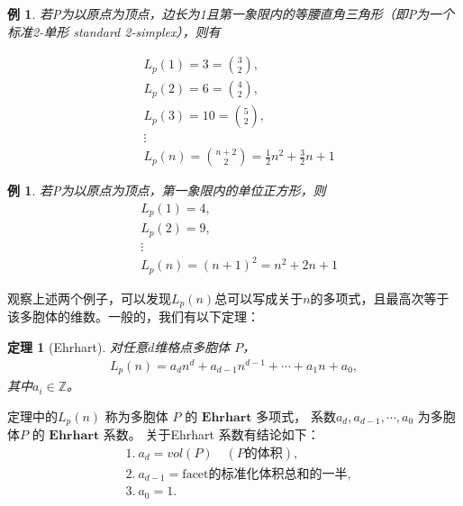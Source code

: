\documentclass[12pt,a4paper]{ctexbook} %
\newcounter{theorem}[section]
\newtheorem{theoreminner}[theorem]{定理}
\newtheorem{example}[theorem]{例}
\numberwithin{figure}{section}
\theoremstyle{problemstyle}
\numberwithin{equation}{section} %
\begin{document}
\begin{example}
若P为以原点为顶点，边长为1且第一象限内的等腰直角三角形（即P为一个标准2-单形 standard 2-simplex），则有

\begin{minipage}{0.5\textwidth}
    \begin{align*}
        &L_p(1)=3=\binom{3}{2}, \\
        &L_p(2)=6=\binom{4}{2}, \\
        &L_p(3)=10=\binom{5}{2},\\ 
        &\vdots \\
        &L_p(n)=\binom{n+2}{2}=\frac{1}{2}n^2+\frac{3}{2}n+1 
    \end{align*}
\end{minipage}
\begin{minipage}{0.5\textwidth}
\end{minipage}

\end{example}

\begin{example}
若P为以原点为顶点，第一象限内的单位正方形，则
\begin{align*}
        &L_p(1)=4, \\
        &L_p(2)=9, \\
        &\vdots \\
        &L_p(n)=(n+1)^2=n^2+2n+1
    \end{align*}

\end{example}

观察上述两个例子，可以发现$L_p(n)$总可以写成关于$n$的多项式，且最高次等于该多胞体的维数。一般的，我们有以下定理：
\begin{theoreminner}[Ehrhart] 
对任意$d$维格点多胞体 $P$，
\begin{align}
L_p(n)=a_dn^d+a_{d-1}n^{d-1}+\cdots+a_1n+a_0,
\label{Ehrhart-polynomial}
\end{align}
其中$a_i\in\mathbb{Z}$。
\end{theoreminner}
定理中的$L_p(n)$ 称为多胞体 $P$ 的 $\textbf{Ehrhart 多项式}$， 系数$a_d, a_{d-1},\cdots,a_0$ 为多胞体$P$ 的 $\textbf{Ehrhart 系数}$。
关于Ehrhart 系数有结论如下：
\begin{align*}
&1.\ a_d=vol(P)\quad(P\text{的体积}),\\
&2.\ a_{d-1}=\text{facet的标准化体积总和的一半},\\
&3.\ a_0=1.
\end{align*}
\end{document}
